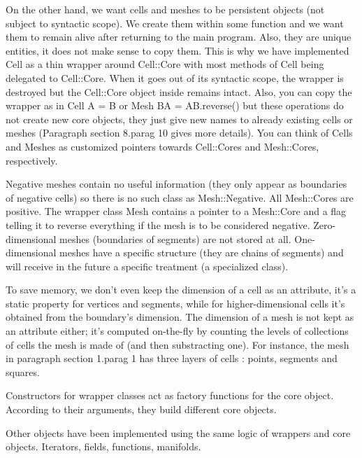 On the other hand, we want cells and meshes to be persistent objects (not subject to
syntactic scope).
We create them within some function and we want them to remain alive after returning
to the main program.
Also, they are unique entities, it does not make sense to copy them.
This is why we have implemented {\codett Cell} as a thin wrapper around {\codett Cell::Core}
with most methods of {\codett Cell} being delegated to {\codett Cell::Core}.
When it goes out of its syntactic scope, the wrapper is destroyed but the {\codett Cell::Core}
object inside remains intact.
Also, you can copy the wrapper as in {\codett Cell A = B} or {\codett Mesh BA = AB.reverse()}
but these operations do not create new core objects, they just give new names to
already existing cells or meshes (Paragraph \numb section 8.\numb parag 10 gives more details).
You can think of {\codett Cell}s and {\codett Mesh}es as customized pointers towards
{\codett Cell::Core}s and {\codett Mesh::Core}s, respectively.

Negative meshes contain no useful information (they only appear as boundaries
of negative cells) so there is no such class as {\codett Mesh::Negative}.
All {\codett Mesh::Core}s are positive.
The wrapper class {\codett Mesh} contains a pointer to a {\codett Mesh::Core} and a flag
telling it to reverse everything if the mesh is to be considered negative.
Zero-dimensional meshes (boundaries of segments) are not stored at all.
One-dimensional meshes have a specific structure (they are chains of segments)
and will receive in the future a specific treatment (a specialized class).

To save memory, we don't even keep the dimension of a cell as an attribute,
it's a static property for vertices and segments, while for higher-dimensional cells
it's obtained from the boundary's dimension.
The dimension of a mesh is not kept as an attribute either; it's computed on-the-fly
by counting the levels of collections of cells the mesh is made of (and then
substracting one).
For instance, the mesh in paragraph \numb section 1.\numb parag 1 has three layers of cells :
points, segments and squares.

Constructors for wrapper classes act as factory functions for the core object.
According to their arguments, they build different core objects.

Other objects have been implemented using the same logic of wrappers and core objects.
Iterators, fields, functions, manifolds.



